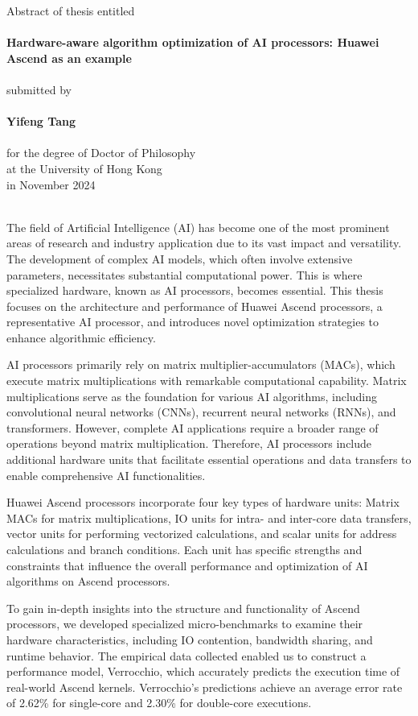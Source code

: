 \centering
Abstract of thesis entitled\\
~\\
{\Large \bf 
    Hardware-aware algorithm optimization of AI processors: Huawei Ascend as an example
}\\
~\\
submitted by\\
~\\
{\Large \bf Yifeng Tang}\\
~\\
for the degree of Doctor of Philosophy\\
at the University of Hong Kong\\
in November 2024\\
~\\
\justifying

The field of Artificial Intelligence (AI) has become one of the most prominent areas of research and industry application due to its vast impact and versatility. The development of complex AI models, which often involve extensive parameters, necessitates substantial computational power. This is where specialized hardware, known as AI processors, becomes essential. This thesis focuses on the architecture and performance of Huawei Ascend processors, a representative AI processor, and introduces novel optimization strategies to enhance algorithmic efficiency.

AI processors primarily rely on matrix multiplier-accumulators (MACs), which execute matrix multiplications with remarkable computational capability. Matrix multiplications serve as the foundation for various AI algorithms, including convolutional neural networks (CNNs), recurrent neural networks (RNNs), and transformers. However, complete AI applications require a broader range of operations beyond matrix multiplication. Therefore, AI processors include additional hardware units that facilitate essential operations and data transfers to enable comprehensive AI functionalities.

Huawei Ascend processors incorporate four key types of hardware units: Matrix MACs for matrix multiplications, IO units for intra- and inter-core data transfers, vector units for performing vectorized calculations, and scalar units for address calculations and branch conditions. Each unit has specific strengths and constraints that influence the overall performance and optimization of AI algorithms on Ascend processors.

To gain in-depth insights into the structure and functionality of Ascend processors, we developed specialized micro-benchmarks to examine their hardware characteristics, including IO contention, bandwidth sharing, and runtime behavior. The empirical data collected enabled us to construct a performance model, Verrocchio, which accurately predicts the execution time of real-world Ascend kernels. Verrocchio's predictions achieve an average error rate of 2.62\% for single-core and 2.30\% for double-core executions.


